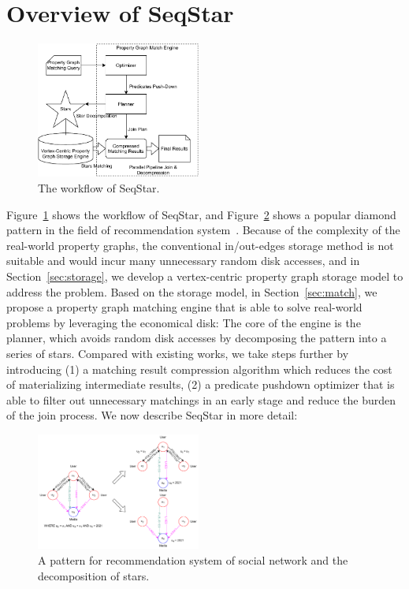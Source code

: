 \section{Overview of SeqStar}\label{sec:framework}
\begin{figure}[ht]
  \centering
  \includegraphics[width=0.48\textwidth]{img/architecture.pdf}
  \caption{The workflow of SeqStar.}\label{img:architecture}
\end{figure}
Figure~\ref{img:architecture} shows the workflow of SeqStar,
and Figure~\ref{img:pattern_graph} shows a popular diamond pattern in the field of recommendation system~\cite{DBLP:journals/pvldb/GuptaSGGZLL14,DBLP:journals/pvldb/SharmaJBLL16}.
Because of the complexity of the real-world property graphs,
the conventional in/out-edges storage method is not suitable and would incur many unnecessary random disk accesses,
and in Section~\ref{sec:storage}, we develop a vertex-centric property graph storage model to address the problem.
Based on the storage model, in Section~\ref{sec:match},
we propose a property graph matching engine that is able to solve real-world problems by leveraging the economical disk:
The core of the engine is the planner, which avoids random disk accesses by decomposing the pattern into a series of stars.
Compared with existing works, we take steps further by introducing
(1) a matching result compression algorithm which reduces the cost of materializing intermediate results,
(2) a predicate pushdown optimizer that is able to filter out unnecessary matchings in an early stage and reduce the burden of the join process.
We now describe SeqStar in more detail:
\begin{figure}[ht]
  \centering
  \includegraphics[width=0.48\textwidth]{img/pattern_graph.pdf}
  \caption{A pattern for recommendation system of social network and the decomposition of stars.}\label{img:pattern_graph}
\end{figure}

